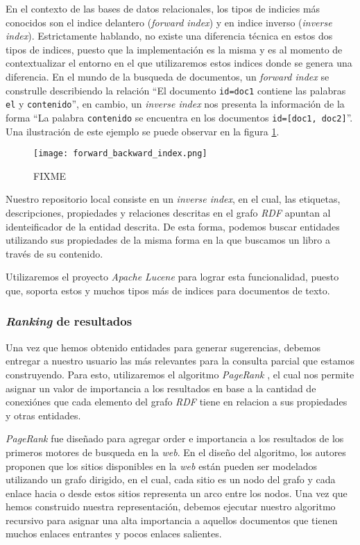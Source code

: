 En el contexto de las bases de datos relacionales, los tipos de indicies más
conocidos son el indice delantero (\textit{forward index}) y en indice inverso
(\textit{inverse index}). Estrictamente hablando, no existe una diferencia
técnica en estos dos tipos de indices, puesto que la implementación es la misma
y es al momento de contextualizar el entorno en el que utilizaremos estos
indices donde se genera una diferencia. En el mundo de la busqueda de
documentos, un \textit{forward index} se construlle describiendo la relación
``El documento \texttt{id=doc1} contiene las palabras \texttt{el} y
\texttt{contenido}'', en cambio, un \textit{inverse index} nos presenta la
información de la forma ``La palabra \texttt{contenido} se encuentra en los
documentos \texttt{id=[doc1, doc2]}''. Una ilustración de este ejemplo se puede
observar en la figura \ref{fig:forward-backward-index}.

\begin{figure}
    \centering
    \texttt{[image: forward\_backward\_index.png]}
    \caption{FIXME}
    \label{fig:forward-backward-index}
\end{figure}

Nuestro repositorio local consiste en un \textit{inverse index}, en el cual, las
etiquetas, descripciones, propiedades y relaciones descritas en el grafo
\textit{RDF} apuntan al identeificador de la entidad descrita. De esta forma,
podemos buscar entidades utilizando sus propiedades de la misma forma en la que
buscamos un libro a través de su contenido.

Utilizaremos el proyecto \textit{Apache Lucene} \cite{apache2012welcome} para
lograr esta funcionalidad, puesto que, soporta estos y muchos tipos más de
indices para documentos de texto.

\subsubsection{\textit{Ranking} de resultados}

Una vez que hemos obtenido entidades para generar sugerencias, debemos entregar
a nuestro usuario las más relevantes para la consulta parcial que estamos
construyendo. Para esto, utilizaremos el algoritmo \textit{PageRank}
\cite{page1999pagerank}, el cual nos permite asignar un valor de importancia a
los resultados en base a la cantidad de conexiónes que cada elemento del grafo
\textit{RDF} tiene en relacion a sus propiedades y otras entidades.

\textit{PageRank} fue diseñado para agregar order e importancia a los resultados
de los primeros motores de busqueda en la \textit{web}. En el diseño del
algoritmo, los autores proponen que los sitios disponibles en la \textit{web}
están pueden ser modelados utilizando un grafo dirigido, en el cual, cada sitio
es un nodo del grafo y cada enlace hacia o desde estos sitios representa un arco
entre los nodos. Una vez que hemos construido nuestra representación, debemos
ejecutar nuestro algoritmo recursivo para asignar una alta importancia a
aquellos documentos que tienen muchos enlaces entrantes y pocos enlaces
salientes.

